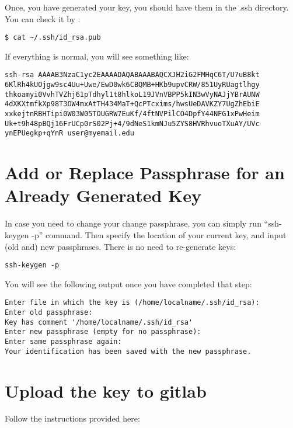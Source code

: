Once, you have generated your key, you should have them in the .ssh
directory. You can check it by :

\begin{verbatim}
$ cat ~/.ssh/id_rsa.pub
\end{verbatim}

If everything is normal, you will see something like:

\begin{verbatim}
ssh-rsa AAAAB3NzaC1yc2EAAAADAQABAAABAQCXJH2iG2FMHqC6T/U7uB8kt
6KlRh4kUOjgw9sc4Uu+Uwe/EwD0wk6CBQMB+HKb9upvCRW/851UyRUagtlhgy
thkoamyi0VvhTVZhj61pTdhyl1t8hlkoL19JVnVBPP5kIN3wVyNAJjYBrAUNW
4dXKXtmfkXp98T3OW4mxAtTH434MaT+QcPTcxims/hwsUeDAVKZY7UgZhEbiE
xxkejtnRBHTipi0W03W05TOUGRW7EuKf/4ftNVPilCO4DpfY44NFG1xPwHeim
Uk+t9h48pBQj16FrUCp0rS02Pj+4/9dNeS1kmNJu5ZYS8HVRhvuoTXuAY/UVc
ynEPUegkp+qYnR user@myemail.edu
\end{verbatim}

\section{Add or Replace Passphrase for an Already Generated
Key}\label{add-or-replace-passphrase-for-an-already-generated-key}

In case you need to change your change passphrase, you can simply run
``ssh-keygen -p'' command. Then specify the location of your current
key, and input (old and) new passphrases. There is no need to
re-generate keys:

\begin{verbatim}
ssh-keygen -p
\end{verbatim}

You will see the following output once you have completed that step:

\begin{verbatim}
Enter file in which the key is (/home/localname/.ssh/id_rsa):
Enter old passphrase:
Key has comment '/home/localname/.ssh/id_rsa'
Enter new passphrase (empty for no passphrase):
Enter same passphrase again:
Your identification has been saved with the new passphrase.  
\end{verbatim}

\section{Upload the key to gitlab}\label{upload-the-key-to-gitlab}

Follow the instructions provided here:

